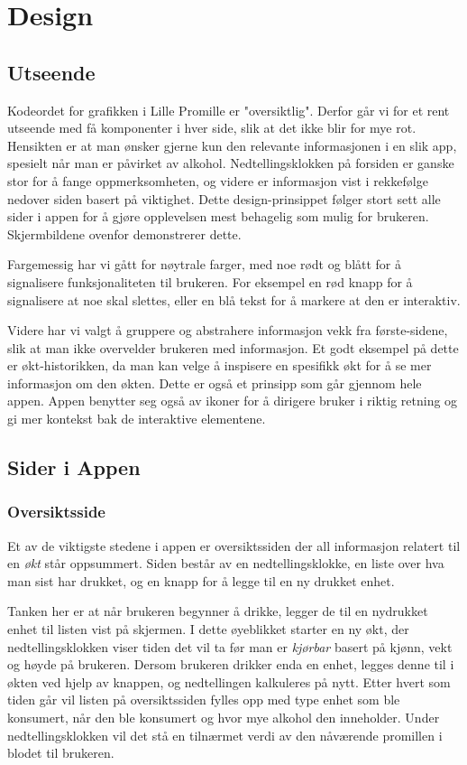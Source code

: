 \section{Design}
\subsection{Utseende}
Kodeordet for grafikken i Lille Promille er "oversiktlig". Derfor går vi for et rent utseende med få komponenter i hver side, slik at det ikke blir for mye rot. Hensikten er at man ønsker gjerne kun den relevante informasjonen i en slik app, spesielt når man er påvirket av alkohol. Nedtellingsklokken på forsiden er ganske stor for å fange oppmerksomheten, og videre er informasjon vist i rekkefølge nedover siden basert på viktighet. Dette design-prinsippet følger stort sett alle sider i appen for å gjøre opplevelsen mest behagelig som mulig for brukeren. Skjermbildene ovenfor demonstrerer dette.

Fargemessig har vi gått for nøytrale farger, med noe rødt og blått for å signalisere funksjonaliteten til brukeren. For eksempel en rød knapp for å signalisere at noe skal slettes, eller en blå tekst for å markere at den er interaktiv.

Videre har vi valgt å gruppere og abstrahere informasjon vekk fra første-sidene, slik at man ikke overvelder brukeren med informasjon. Et godt eksempel på dette er økt-historikken, da man kan velge å inspisere en spesifikk økt for å se mer informasjon om den økten. Dette er også et prinsipp som går gjennom hele appen. Appen benytter seg også av ikoner for å dirigere bruker i riktig retning og gi mer kontekst bak de interaktive elementene.

\subsection{Sider i Appen}
\subsubsection{Oversiktsside}
Et av de viktigste stedene i appen er oversiktssiden der all informasjon relatert til en \textit{økt} står oppsummert. Siden består av en nedtellingsklokke, en liste over hva man sist har drukket, og en knapp for å legge til en ny drukket enhet. 

Tanken her er at når brukeren begynner å drikke, legger de til en nydrukket enhet til listen vist på skjermen. I dette øyeblikket starter en ny økt, der nedtellingsklokken viser tiden det vil ta før man er \textit{kjørbar} basert på kjønn, vekt og høyde på brukeren. Dersom brukeren drikker enda en enhet, legges denne til i økten ved hjelp av knappen, og nedtellingen kalkuleres på nytt. Etter hvert som tiden går vil listen på oversiktssiden fylles opp med type enhet som ble konsumert, når den ble konsumert og hvor mye alkohol den inneholder. Under nedtellingsklokken vil det stå en tilnærmet verdi av den nåværende promillen i blodet til brukeren. 

